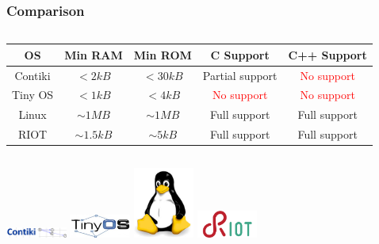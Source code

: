 \documentclass{beamer}
\begin{document}
\begin{frame}
	\frametitle{Comparison}
	\begin{columns}[c]
		\begin{column}{30cm}
			\hspace{0.9cm}
			\begin{tabular}{| c | c | c | c | c |}
				\hline
				OS & Min RAM & Min ROM & C Support & C++ Support \\ \hline
				Contiki & $< 2kB$ & $< 30kB$ & \textcolor{TextOrange}{Partial support} &
				\textcolor{red}{No support} \\ \hline
				Tiny OS & $< 1kB$ & $< 4kB$ & \textcolor{red}{No support} &
				\textcolor{red}{No support} \\ \hline
				Linux & $\sim 1MB$ & $\sim 1MB$ & \textcolor{TextGreen}{Full support} &
				\textcolor{TextGreen}{Full support} \\ \hline
				RIOT & $\sim 1.5kB$ & $\sim 5kB$ & \textcolor{TextGreen}{Full support} &
				\textcolor{TextGreen}{Full support} \\ \hline
			\end{tabular}
		\end{column}
	\end{columns}
	\vspace{.5cm}
	\hspace*{1cm}
	\includegraphics[width=2cm]{figs/contiki-logo.png}
	\hspace*{.5cm}
	\includegraphics[width=2cm]{figs/tinyos-logo.jpg}
	\hspace*{.5cm}
	\includegraphics[width=2cm]{figs/linux-logo.jpeg}
	\hspace*{.5cm}
	\includegraphics[width=2cm]{figs/riot-logo.png}
\end{frame}
\end{document}
